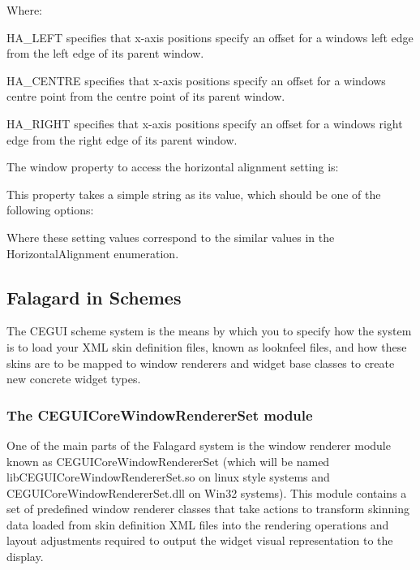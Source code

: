Where\+: \begin{DoxyItemize}
\item {\ttfamily H\+A\+\_\+\+L\+E\+FT} specifies that x-\/axis positions specify an offset for a window\textquotesingle{}s left edge from the left edge of it\textquotesingle{}s parent window. \item {\ttfamily H\+A\+\_\+\+C\+E\+N\+T\+RE} specifies that x-\/axis positions specify an offset for a window\textquotesingle{}s centre point from the centre point of it\textquotesingle{}s parent window. \item {\ttfamily H\+A\+\_\+\+R\+I\+G\+HT} specifies that x-\/axis positions specify an offset for a window\textquotesingle{}s right edge from the right edge of it\textquotesingle{}s parent window.\end{DoxyItemize}
The window property to access the horizontal alignment setting is\+: 
\begin{DoxyCode}{0}
\DoxyCodeLine{\textcolor{stringliteral}{"HorizontalAlignment"}}
\end{DoxyCode}


This property takes a simple string as its value, which should be one of the following options\+: 
\begin{DoxyCode}{0}
\DoxyCodeLine{\textcolor{stringliteral}{"Left"}}
\DoxyCodeLine{\textcolor{stringliteral}{"Centre"}}
\DoxyCodeLine{\textcolor{stringliteral}{"Right"}}
\end{DoxyCode}


Where these setting values correspond to the similar values in the Horizontal\+Alignment enumeration.\hypertarget{fal_intro_fal_schemes}{}\subsection{Falagard in Schemes}\label{fal_intro_fal_schemes}
The C\+E\+G\+UI scheme system is the means by which you to specify how the system is to load your X\+ML skin definition files, known as \textquotesingle{}looknfeel\textquotesingle{} files, and how these skins are to be mapped to window renderers and widget base classes to create new concrete widget types.\hypertarget{fal_intro_fal_wr_modules}{}\subsubsection{The C\+E\+G\+U\+I\+Core\+Window\+Renderer\+Set module}\label{fal_intro_fal_wr_modules}
One of the main parts of the Falagard system is the window renderer module known as C\+E\+G\+U\+I\+Core\+Window\+Renderer\+Set (which will be named lib\+C\+E\+G\+U\+I\+Core\+Window\+Renderer\+Set.\+so on linux style systems and C\+E\+G\+U\+I\+Core\+Window\+Renderer\+Set.\+dll on Win32 systems). This module contains a set of predefined window renderer classes that take actions to transform skinning data loaded from skin definition X\+ML files into the rendering operations and layout adjustments required to output the widget visual representation to the display.

